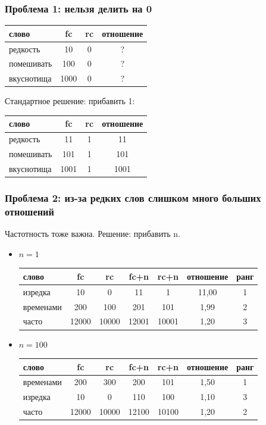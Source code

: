\documentclass[svgnames]{beamer}
\begin{document}
\begin{frame}
  \frametitle{Проблема 1:  нельзя делить на 0}
  \begin{tabular}[l]{lccc}
    слово & fc & rc & отношение \\
    \hline
    редкость & 10 & 0 &  ? \\
    помешивать & 100 & 0 &  ? \\
    вкуснотища & 1000 & 0 &  ? \\
  \end{tabular}

Стандартное решение: прибавить 1:

  \begin{tabular}[l]{lccc}
    слово & fc & rc & отношение \\
    \hline
    редкость & 11 & 1 &  11 \\
    помешивать & 101 & 1 &  101 \\
    вкуснотища & 1001 & 1 &  1001 \\
  \end{tabular}
\end{frame}

\begin{frame}
  \frametitle{Проблема 2: из-за редких слов слишком много больших
    отношений}
  Частотность тоже важна.   Решение: прибавить n.

  \begin{itemize}
  \item $n=1$

  \begin{tabular}[l]{lcccccc}
    слово & fc & rc & fc+n & rc+n & отношение & ранг \\
    \hline
    изредка & 10 & 0 & 11 & 1 & 11,00 & 1 \\
    временами & 200 & 100 & 201 & 101 & 1,99 & 2 \\
    часто & 12000 & 10000 & 12001 & 10001 & 1,20 & 3 \\
  \end{tabular}
  
  \item $n=100$

  \begin{tabular}[l]{lcccccc}
    слово & fc & rc & fc+n & rc+n & отношение & ранг \\
    \hline
    временами & 200 & 300 & 200 & 101 & 1,50 & 1 \\
    изредка & 10 & 0 & 110 & 100 & 1,10 &  3 \\
    часто & 12000 & 10000 & 12100 & 10100 & 1,20 & 2 \\
  \end{tabular}

  \end{itemize}
  
\end{frame}
\end{document}

